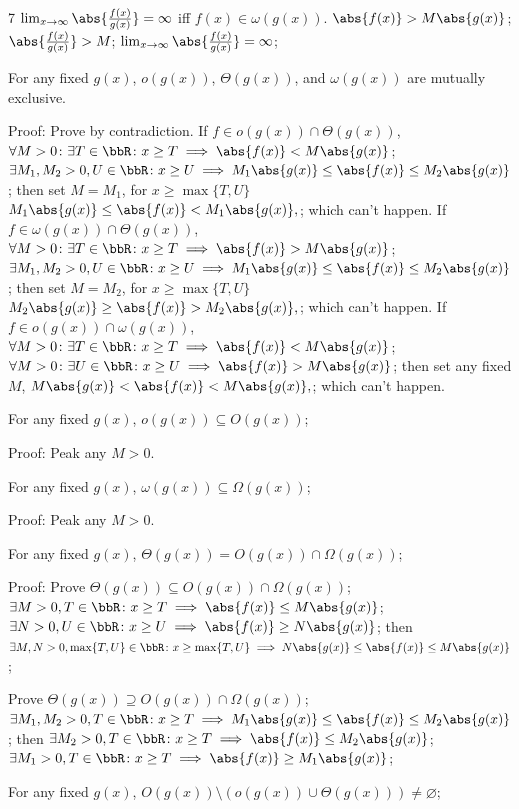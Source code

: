 \documentclass[a4paper,10pt]{extarticle}
\begin{document}
\begin{multicols}{7}
$\lim_{x\to\infty}\abs{\frac{f(x)}{g(x)}}=\infty$ iff $f(x)\in \omega(g(x))$.
\(\abs{f(x)}>M\abs{g(x)}\); 
\(\abs{\frac{f(x)}{g(x)}}>M\); 
\(\lim_{x\to\infty}\abs{\frac{f(x)}{g(x)}}=\infty\); 


For any fixed $g(x)$, $o(g(x))$, $\Theta(g(x))$, and $\omega(g(x))$ are mutually exclusive.

Proof:
Prove by contradiction. If $f\in o(g(x))\cap\Theta(g(x))$,
\(\forall M>0\colon\exists T\in\bbR\colon x\ge T\implies\abs{f(x)}<M\abs{g(x)}\); 
\(\exists M_1,M_2>0,U\in\bbR\colon x\ge U\implies M_1\abs{g(x)}\le\abs{f(x)}\le M_2\abs{g(x)}\); 
then set $M=M_1$, for $x\ge\max\{T,U\}$
\(M_1\abs{g(x)}\le\abs{f(x)}<M_1\abs{g(x)},\); 
which can't happen. If $f\in \omega(g(x))\cap\Theta(g(x))$,
\(\forall M>0\colon\exists T\in\bbR\colon x\ge T\implies\abs{f(x)}>M\abs{g(x)}\); 
\(\exists M_1,M_2>0,U\in\bbR\colon x\ge U\implies M_1\abs{g(x)}\le\abs{f(x)}\le M_2\abs{g(x)}\); 
then set $M=M_2$, for $x\ge\max\{T,U\}$
\(M_2\abs{g(x)}\ge\abs{f(x)}>M_2\abs{g(x)},\); 
which can't happen. If $f\in o(g(x))\cap\omega(g(x))$,
\(\forall M>0\colon\exists T\in\bbR\colon x\ge T\implies\abs{f(x)}<M\abs{g(x)}\); 
\(\forall M>0\colon\exists U\in\bbR\colon x\ge U\implies\abs{f(x)}>M\abs{g(x)}\); 
then set any fixed $M$,
\(M\abs{g(x)}<\abs{f(x)}<M\abs{g(x)},\); 
which can't happen.

For any fixed $g(x)$,
\(o(g(x))\subseteq O(g(x))\); 

Proof:
Peak any $M>0$.

For any fixed $g(x)$,
\(\omega(g(x))\subseteq\Omega(g(x))\); 

Proof:
Peak any $M>0$.

For any fixed $g(x)$,
\(\Theta(g(x))=O(g(x))\cap\Omega(g(x))\); 

Proof:
Prove
\(\Theta(g(x))\subseteq O(g(x))\cap\Omega(g(x))\); 
\(\exists M>0,T\in\bbR\colon x\ge T\implies\abs{f(x)}\le M\abs{g(x)}\); 
\(\exists N>0,U\in\bbR\colon x\ge U\implies\abs{f(x)}\ge N\abs{g(x)}\); 
then
\(\exists M,N>0,\max\{T,U\}\in\bbR\colon x\ge \max\{T,U\}\implies N\abs{g(x)}\le\abs{f(x)}\le M\abs{g(x)}\); 

Prove
\(\Theta(g(x))\supseteq O(g(x))\cap\Omega(g(x))\); 
\(\exists M_1,M_2>0,T\in\bbR\colon x\ge T\implies M_1\abs{g(x)}\le\abs{f(x)}\le M_2\abs{g(x)}\); 
then
\(\exists M_2>0,T\in\bbR\colon x\ge T\implies\abs{f(x)}\le M_2\abs{g(x)}\); 
\(\exists M_1>0,T\in\bbR\colon x\ge T\implies\abs{f(x)}\ge M_1\abs{g(x)}\); 

For any fixed $g(x)$,
\(O(g(x))\setminus (o(g(x))\cup\Theta(g(x)))\ne\varnothing\); 


\end{multicols}
\end{document}
